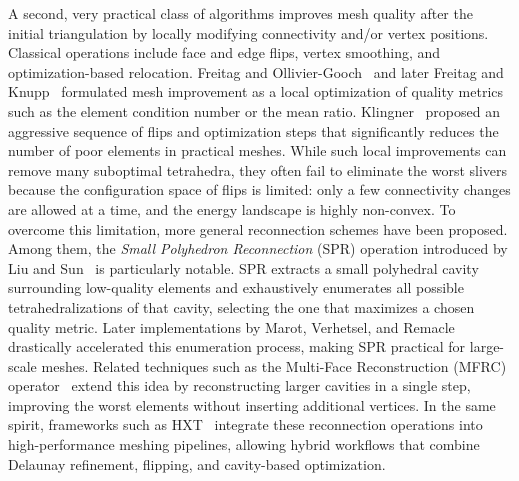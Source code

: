 \documentclass{article}
\begin{document}

A second, very practical class of algorithms improves mesh quality after the initial triangulation by locally modifying connectivity and/or vertex positions.  
Classical operations include face and edge flips, vertex smoothing, and optimization-based relocation.  
Freitag and Ollivier-Gooch~\cite{FreitagOllivierGooch1997_MeshImprovement} and later Freitag and Knupp~\cite{FreitagKnupp2002} formulated mesh improvement as a local optimization of quality metrics such as the element condition number or the mean ratio.  
Klingner~\cite{Klingner2008_AggressiveTetrahedralMeshImprovement} proposed an aggressive sequence of flips and optimization steps that significantly reduces the number of poor elements in practical meshes.
While such local improvements can remove many suboptimal tetrahedra, they often fail to eliminate the worst slivers because the configuration space of flips is limited: only a few connectivity changes are allowed at a time, and the energy landscape is highly non-convex.  
To overcome this limitation, more general reconnection schemes have been proposed.  
Among them, the \emph{Small Polyhedron Reconnection} (SPR) operation introduced by Liu and Sun~\cite{LiuSun2006_SPR} is particularly notable.  
SPR extracts a small polyhedral cavity surrounding low-quality elements and exhaustively enumerates all possible tetrahedralizations of that cavity, selecting the one that maximizes a chosen quality metric.  
Later implementations by Marot, Verhetsel, and Remacle~\cite{MarotVerhetselRemacle2019_SPR} drastically accelerated this enumeration process, making SPR practical for large-scale meshes.  
Related techniques such as the Multi-Face Reconstruction (MFRC) operator~\cite{MaWang2021_MFRC} extend this idea by reconstructing larger cavities in a single step, improving the worst elements without inserting additional vertices. In
the same spirit, frameworks such as HXT~\cite{MarotPelerinRemacle2019} integrate these reconnection operations into high-performance meshing pipelines, allowing hybrid workflows that combine Delaunay refinement, flipping, and cavity-based optimization.
\end{document}
